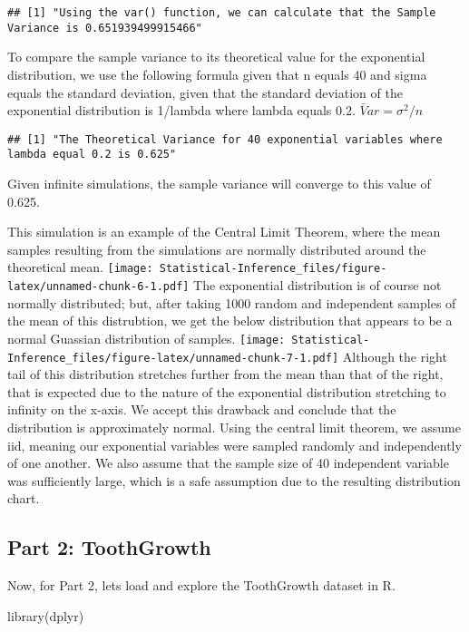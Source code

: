 \documentclass[
]{article}
\newenvironment{Shaded}{\begin{snugshade}}{\end{snugshade}}
\newcommand{\FunctionTok}[1]{\textcolor[rgb]{0.00,0.00,0.00}{#1}}
\newcommand{\NormalTok}[1]{#1}
\begin{document}
\begin{verbatim}
## [1] "Using the var() function, we can calculate that the Sample Variance is 0.651939499915466"
\end{verbatim}

To compare the sample variance to its theoretical value for the
exponential distribution, we use the following formula given that n
equals 40 and sigma equals the standard deviation, given that the
standard deviation of the exponential distribution is 1/lambda where
lambda equals 0.2. \(\bar Var = \sigma^2 / n\)

\begin{verbatim}
## [1] "The Theoretical Variance for 40 exponential variables where lambda equal 0.2 is 0.625"
\end{verbatim}

Given infinite simulations, the sample variance will converge to this
value of 0.625.

This simulation is an example of the Central Limit Theorem, where the
mean samples resulting from the simulations are normally distributed
around the theoretical mean.
\texttt{[image: Statistical-Inference\_files/figure-latex/unnamed-chunk-6-1.pdf]}
The exponential distribution is of course not normally distributed; but,
after taking 1000 random and independent samples of the mean of this
distrubtion, we get the below distribution that appears to be a normal
Guassian distribution of samples.
\texttt{[image: Statistical-Inference\_files/figure-latex/unnamed-chunk-7-1.pdf]}
Although the right tail of this distribution stretches further from the
mean than that of the right, that is expected due to the nature of the
exponential distribution stretching to infinity on the x-axis. We accept
this drawback and conclude that the distribution is approximately
normal. Using the central limit theorem, we assume iid, meaning our
exponential variables were sampled randomly and independently of one
another. We also assume that the sample size of 40 independent variable
was sufficiently large, which is a safe assumption due to the resulting
distribution chart.

\hypertarget{part-2-toothgrowth}{%
\subsection{Part 2: ToothGrowth}\label{part-2-toothgrowth}}

Now, for Part 2, lets load and explore the ToothGrowth dataset in R.

\begin{Shaded}
\begin{Highlighting}[]
\FunctionTok{library}\NormalTok{(dplyr)}
\end{Highlighting}
\end{Shaded}
\end{document}

